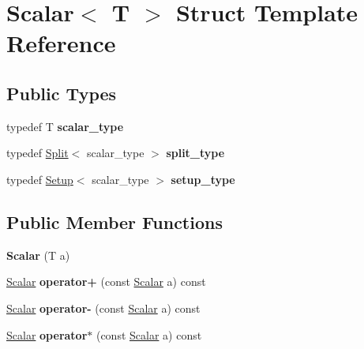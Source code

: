 \hypertarget{struct_scalar}{}\section{Scalar$<$ T $>$ Struct Template Reference}
\label{struct_scalar}
\subsection*{Public Types}
\begin{DoxyCompactItemize}
\item 
\mbox{\label{struct_scalar_ab698883f350c765b78a3b2be2ea953b6}} 
typedef T {\bfseries scalar\+\_\+type}
\item 
\mbox{\label{struct_scalar_a6ffb3ccdb92c062080e849973fe30939}} 
typedef \hyperlink{struct_split}{Split}$<$ scalar\+\_\+type $>$ {\bfseries split\+\_\+type}
\item 
\mbox{\label{struct_scalar_aabf3f58f0f60074762cd183b25935997}} 
typedef \hyperlink{struct_setup}{Setup}$<$ scalar\+\_\+type $>$ {\bfseries setup\+\_\+type}
\end{DoxyCompactItemize}
\subsection*{Public Member Functions}
\begin{DoxyCompactItemize}
\item 
\mbox{\label{struct_scalar_a7e8d1216e14a468ecc168da71b0e85ba}} 
{\bfseries Scalar} (T a)
\item 
\mbox{\label{struct_scalar_af5dfa304d262741ed5f15f980ff40b1c}} 
\hyperlink{struct_scalar}{Scalar} {\bfseries operator+} (const \hyperlink{struct_scalar}{Scalar} a) const
\item 
\mbox{\label{struct_scalar_af9f7a962a88f42b97524a7e3234349e0}} 
\hyperlink{struct_scalar}{Scalar} {\bfseries operator-\/} (const \hyperlink{struct_scalar}{Scalar} a) const
\item 
\mbox{\label{struct_scalar_a2162f3681478d8e098e556cff9ab072e}} 
\hyperlink{struct_scalar}{Scalar} {\bfseries operator$\ast$} (const \hyperlink{struct_scalar}{Scalar} a) const
\end{DoxyCompactItemize}
